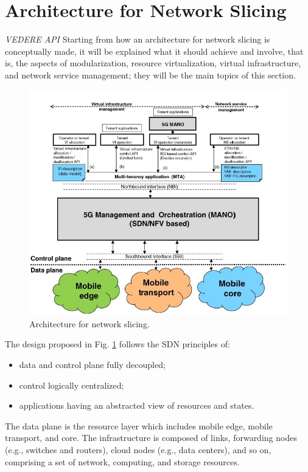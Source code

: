 \documentclass{report}
\begin{document}
\newpage
\section{Architecture for Network Slicing} 
\textit{VEDERE API}
Starting from how an architecture for network slicing is conceptually made, it will be explained what it should achieve and involve, that is, the aspects of modularization, resource virtualization, virtual infrastructure, and network service management; they will be the main topics of this section.
\begin{figure}[h]
\centering
\includegraphics[scale=0.67]{pics/2.JPG}
\caption{Architecture for network slicing.} 
\label{Arch}
\end{figure}
The design proposed in Fig. \ref{Arch} follows the SDN principles of:
\begin{itemize}
\item data and control plane fully decoupled;
\end{itemize}
\begin{itemize}
\item control logically centralized;
\end{itemize}
\begin{itemize}
\item applications having an abstracted view of resources and states.
\end{itemize}
The data plane is the resource layer which includes mobile edge, mobile transport, and core. The infrastructure is composed of links, forwarding nodes (e.g., switches and routers), cloud nodes (e.g., data centers), and so on, comprising a set of network, computing, and storage resources.\\
\end{document}
